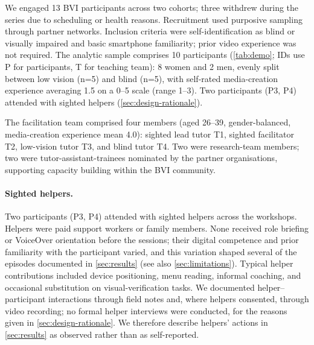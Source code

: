 We engaged 13 BVI participants across two cohorts; three withdrew during the series due to scheduling or health reasons. Recruitment used purposive sampling through partner networks. Inclusion criteria were self-identification as blind or visually impaired and basic smartphone familiarity; prior video experience was not required. The analytic sample comprises 10 participants (\autoref{tab:demo}; IDs use P for participants, T for teaching team): 8 women and 2 men, evenly split between low vision (n=5) and blind (n=5), with self-rated media-creation experience averaging 1.5 on a 0--5 scale (range 1--3). Two participants (P3, P4) attended with sighted helpers (\autoref{sec:design-rationale}).

The facilitation team comprised four members (aged 26--39, gender-balanced, media-creation experience mean 4.0): sighted lead tutor T1, sighted facilitator T2, low-vision tutor T3, and blind tutor T4. Two were research-team members; two were tutor-assistant-trainees nominated by the partner organisations, supporting capacity building within the BVI community.

\paragraph{Sighted helpers.}
Two participants (P3, P4) attended with sighted helpers across the workshops. Helpers were paid support workers or family members. None received role briefing or VoiceOver orientation before the sessions; their digital competence and prior familiarity with the participant varied, and this variation shaped several of the episodes documented in \autoref{sec:results} (see also \autoref{sec:limitations}). Typical helper contributions included device positioning, menu reading, informal coaching, and occasional substitution on visual-verification tasks. We documented helper--participant interactions through field notes and, where helpers consented, through video recording; no formal helper interviews were conducted, for the reasons given in \autoref{sec:design-rationale}. We therefore describe helpers' actions in \autoref{sec:results} as observed rather than as self-reported.
